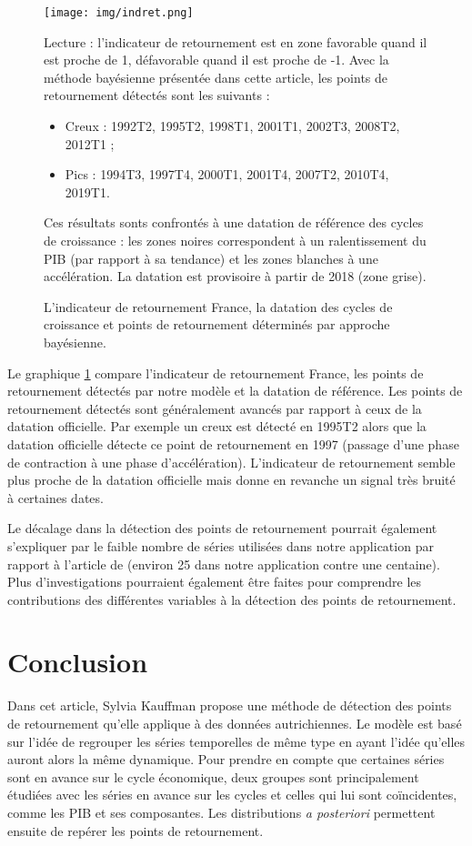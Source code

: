 \documentclass[10pt,french,french]{article}
\begin{document}
\begin{figure}[h]
{\centering
\texttt{[image: img/indret.png]}
\caption{L’indicateur de retournement France, la datation des cycles de croissance et points de retournement déterminés par approche bayésienne.}\label{fig:indret}}
\footnotesize
Lecture : l’indicateur de retournement est en zone favorable quand il est proche de 1, défavorable quand il est proche de -1.
Avec la méthode bayésienne présentée dans cette article, les points de retournement détectés sont les suivants :
\begin{itemize}
\item Creux : 1992T2, 1995T2, 1998T1, 2001T1, 2002T3, 2008T2, 2012T1 ;
\item Pics : 1994T3, 1997T4, 2000T1, 2001T4, 2007T2, 2010T4, 2019T1.
\end{itemize}
Ces résultats sonts confrontés à une datation de référence des cycles de croissance : les zones noires correspondent à un ralentissement du PIB (par rapport à sa tendance) et les zones blanches à une accélération. La datation est provisoire à partir de 2018 (zone grise).
\end{figure}

Le graphique \ref{fig:indret} compare l'indicateur de retournement France, les points de retournement détectés par notre modèle et la datation de référence.
Les points de retournement détectés sont généralement avancés par rapport à ceux de la datation officielle.
Par exemple un creux est détecté en 1995T2 alors que la datation officielle détecte ce point de retournement en 1997 (passage d'une phase de contraction à une phase d'accélération).
L'indicateur de retournement semble plus proche de la datation officielle mais donne en revanche un signal très bruité à certaines dates.

Le décalage dans la détection des points de retournement pourrait également s'expliquer par le faible nombre de séries utilisées dans notre application par rapport à l'article de \cite{Kaufmann} (environ 25 dans notre application contre une centaine).
Plus d'investigations pourraient également être faites pour comprendre les contributions des différentes variables à la détection des points de retournement.

\hypertarget{conclusion}{%
\section{Conclusion}\label{conclusion}}

Dans cet article, Sylvia Kauffman propose une méthode de détection des points de retournement qu'elle applique à des données autrichiennes. Le modèle est basé sur l'idée de regrouper les séries temporelles de même type en ayant l'idée qu'elles auront alors la même dynamique. Pour prendre en compte que certaines séries sont en avance sur le cycle économique, deux groupes sont principalement étudiées avec les séries en avance sur les cycles et celles qui lui sont coïncidentes, comme les PIB et ses composantes. Les distributions \emph{a posteriori} permettent ensuite de repérer les points de retournement.
\end{document}
